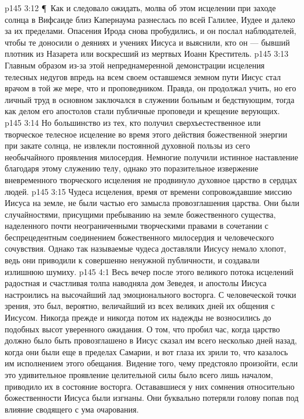 \vs p145 3:12 \P\ Как и следовало ожидать, молва об этом исцелении при заходе солнца в Вифсаиде близ Капернаума разнеслась по всей Галилее, Иудее и далеко за их пределами. Опасения Ирода снова пробудились, и он послал наблюдателей, чтобы те доносили о деяниях и учениях Иисуса и выяснили, кто он --- бывший плотник из Назарета или воскресший из мертвых Иоанн Креститель.
\vs p145 3:13 Главным образом из\hyp{}за этой непреднамеренной демонстрации исцеления телесных недугов впредь на всем своем оставшемся земном пути Иисус стал врачом в той же мере, что и проповедником. Правда, он продолжал учить, но его личный труд в основном заключался в служении больным и бедствующим, тогда как делом его апостолов стали публичные проповеди и крещение верующих.
\vs p145 3:14 Но большинство из тех, кто получил сверхъестественное или творческое телесное исцеление во время этого действия божественной энергии при закате солнца, не извлекли постоянной духовной пользы из сего необычайного проявления милосердия. Немногие получили истинное наставление благодаря этому служению телу, однако это поразительное извержение вневременного творческого исцеления не продвинуло духовное царство в сердцах людей.
\vs p145 3:15 Чудеса исцеления, время от времени сопровождавшие миссию Иисуса на земле, не были частью его замысла провозглашения царства. Они были случайностями, присущими пребыванию на земле божественного существа, наделенного почти неограниченными творческими правами в сочетании с беспрецедентным соединением божественного милосердия и человеческого сочувствия. Однако так называемые чудеса доставляли Иисусу немало хлопот, ведь они приводили к совершенно ненужной публичности, и создавали излишнюю шумиху.
\vs p145 4:1 Весь вечер после этого великого потока исцелений радостная и счастливая толпа наводняла дом Зеведея, и апостолы Иисуса настроились на высочайший лад эмоционального восторга. С человеческой точки зрения, это был, вероятно, величайший из всех великих дней их общения с Иисусом. Никогда прежде и никогда потом их надежды не возносились до подобных высот уверенного ожидания. О том, что пробил час, когда царство должно было быть провозглашено в  Иисус сказал им всего несколько дней назад, когда они были еще в пределах Самарии, и вот глаза их зрили то, что казалось им исполнением этого обещания. Видение того, чему предстояло произойти, если это удивительное проявление целительной силы было всего лишь началом, приводило их в состояние восторга. Остававшиеся у них сомнения относительно божественности Иисуса были изгнаны. Они буквально потеряли голову попав под влияние сводящего с ума очарования.
